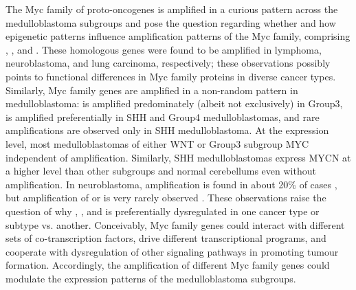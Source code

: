 The Myc family of proto-oncogenes is amplified in a curious pattern across the medulloblastoma subgroups and pose the question regarding whether and how epigenetic patterns influence amplification patterns of the Myc family, comprising , , and . These homologous genes were found to be amplified in lymphoma, neuroblastoma, and lung carcinoma, respectively; these observations possibly points to functional differences in Myc family proteins in diverse cancer types. Similarly, Myc family genes are amplified in a non-random pattern in medulloblastoma:  is amplified predominately (albeit not exclusively) in Group3,  is amplified preferentially in SHH and Group4 medulloblastomas, and rare  amplifications are observed only in SHH medulloblastoma. At the expression level, most medulloblastomas of either WNT or Group3 subgroup MYC independent of amplification. Similarly, SHH medulloblastomas express MYCN at a higher level than other subgroups and normal cerebellums even without  amplification. 
In neuroblastoma,  amplification is found in about 20\% of cases , but amplification of  or  is very rarely observed . These observations raise the question of why , , and  is preferentially dysregulated in one cancer type or subtype vs. another. Conceivably, Myc family genes could interact with different sets of co-transcription factors, drive different transcriptional programs, and cooperate with dysregulation of other signaling pathways in promoting tumour formation. Accordingly, the amplification of different Myc family genes could modulate the expression patterns of the medulloblastoma subgroups.

